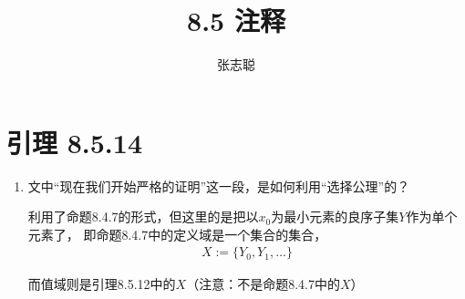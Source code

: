 \documentclass{article}
\begin{document}
\title{8.5 注释}
\author{张志聪}
\maketitle

\section*{引理 8.5.14}

\begin{enumerate}
  \item 文中“现在我们开始严格的证明”这一段，是如何利用“选择公理”的？
  
  利用了命题8.4.7的形式，但这里的是把以$x_0$为最小元素的良序子集$Y$作为单个元素了，
  即命题8.4.7中的定义域是一个集合的集合，
  \begin{align*}
    X := \{Y_0, Y_1, \dots\}
  \end{align*}

  而值域则是引理8.5.12中的$X$（注意：不是命题8.4.7中的$X$）
\end{enumerate}
\end{document}
